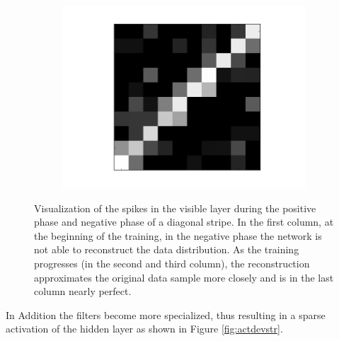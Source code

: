 \begin{figure}[h!]
\begin{subfigure}{.25\textwidth}
  		\label{fig:sub1}
	\end{subfigure}%
	\begin{subfigure}{.25\textwidth}
  		\centering
  		\includegraphics[width=0.8\linewidth]{imgs/reconst/00008.png}
  		\label{fig:sub1}
	\end{subfigure}%
	\caption[Visualization of the spikes in the visible layer during the positive phase and negative phase of a diagonal stripe.]{Visualization of the spikes in the visible layer during the positive phase and negative phase of a diagonal stripe. In the first column, at the beginning of the training, in the negative phase the network is not able to reconstruct the data distribution. As the training progresses (in the second and third column), the reconstruction approximates the original data sample more closely and is in the last column nearly perfect.}
	\label{fig:posnegstrec}
\end{figure}

In Addition the filters become more specialized, thus resulting in a sparse activation of the hidden layer as shown in Figure \ref{fig:actdevstr}.  

